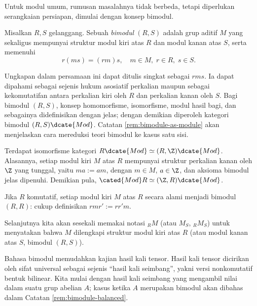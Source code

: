 Untuk modul umum, rumusan masalahnya tidak berbeda, tetapi diperlukan serangkaian persiapan, dimulai dengan konsep bimodul.
\begin{definition}[Bimodul]
	Misalkan $R, S$ gelanggang. Sebuah \emph{bimodul} $(R, S)$ adalah grup aditif $M$ yang sekaligus mempunyai struktur modul kiri atas $R$ dan modul kanan atas $S$, serta memenuhi
	\[ r(ms) = (rm)s, \quad m \in M, \; r \in R, \; s \in S. \]
\end{definition}
Ungkapan dalam persamaan ini dapat ditulis singkat sebagai $rms$. Ia dapat dipahami sebagai sejenis hukum asosiatif perkalian maupun sebagai kekomutatifan antara perkalian kiri oleh $R$ dan perkalian kanan oleh $S$. Bagi bimodul $(R, S)$, konsep homomorfisme, isomorfisme, modul hasil bagi, dan sebagainya didefinisikan dengan jelas; dengan demikian diperoleh kategori bimodul $(R, S)\dcate{Mod}$. Catatan \ref{rem:bimodule-as-module} akan menjelaskan cara mereduksi teori bimodul ke kasus satu sisi.

\begin{example}\label{eg:bimodule-Z}
	Terdapat isomorfisme kategori $R\dcate{Mod} \simeq (R, \Z)\dcate{Mod}$. Alasannya, setiap modul kiri $M$ atas $R$ mempunyai struktur perkalian kanan oleh $\Z$ yang tunggal, yaitu $ma := am$, dengan $m \in M$, $a \in \Z$, dan aksioma bimodul jelas dipenuhi. Demikian pula, $\cated{Mod}R \simeq (\Z, R)\dcate{Mod}$.
\end{example}

\begin{example}\label{eg:bimodule-comm}
	Jika $R$ komutatif, setiap modul kiri $M$ atas $R$ secara alami menjadi bimodul $(R, R)$: cukup definisikan $rmr' := rr' m$.
\end{example}

\begin{convention}
	Selanjutnya kita akan sesekali memakai notasi ${}_R M$ (atau $M_S$, ${}_R M_S$) untuk menyatakan bahwa $M$ dilengkapi struktur modul kiri atas $R$ (atau modul kanan atas $S$, bimodul $(R, S)$).
\end{convention}

Bahasa bimodul memudahkan kajian hasil kali tensor. Hasil kali tensor dicirikan oleh sifat universal sebagai sejenis ``hasil kali seimbang'', yakni versi nonkomutatif bentuk bilinear. Kita mulai dengan hasil kali seimbang yang mengambil nilai dalam suatu grup abelian $A$; kasus ketika $A$ merupakan bimodul akan dibahas dalam Catatan \ref{rem:bimodule-balanced}.

